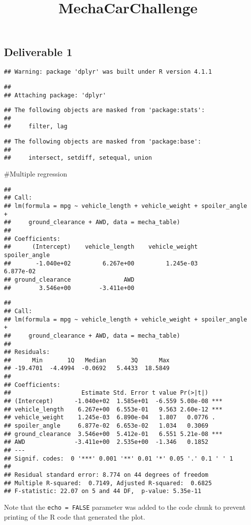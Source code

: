 \documentclass[
]{article}
\title{MechaCarChallenge}
\author{}
\date{\vspace{-2.5em}}
\begin{document}
\maketitle

\hypertarget{deliverable-1}{%
\subsection{Deliverable 1}\label{deliverable-1}}

\begin{verbatim}
## Warning: package 'dplyr' was built under R version 4.1.1
\end{verbatim}

\begin{verbatim}
## 
## Attaching package: 'dplyr'
\end{verbatim}

\begin{verbatim}
## The following objects are masked from 'package:stats':
## 
##     filter, lag
\end{verbatim}

\begin{verbatim}
## The following objects are masked from 'package:base':
## 
##     intersect, setdiff, setequal, union
\end{verbatim}

\#Multiple regression

\begin{verbatim}
## 
## Call:
## lm(formula = mpg ~ vehicle_length + vehicle_weight + spoiler_angle + 
##     ground_clearance + AWD, data = mecha_table)
## 
## Coefficients:
##      (Intercept)    vehicle_length    vehicle_weight     spoiler_angle  
##       -1.040e+02         6.267e+00         1.245e-03         6.877e-02  
## ground_clearance               AWD  
##        3.546e+00        -3.411e+00
\end{verbatim}

\begin{verbatim}
## 
## Call:
## lm(formula = mpg ~ vehicle_length + vehicle_weight + spoiler_angle + 
##     ground_clearance + AWD, data = mecha_table)
## 
## Residuals:
##      Min       1Q   Median       3Q      Max 
## -19.4701  -4.4994  -0.0692   5.4433  18.5849 
## 
## Coefficients:
##                    Estimate Std. Error t value Pr(>|t|)    
## (Intercept)      -1.040e+02  1.585e+01  -6.559 5.08e-08 ***
## vehicle_length    6.267e+00  6.553e-01   9.563 2.60e-12 ***
## vehicle_weight    1.245e-03  6.890e-04   1.807   0.0776 .  
## spoiler_angle     6.877e-02  6.653e-02   1.034   0.3069    
## ground_clearance  3.546e+00  5.412e-01   6.551 5.21e-08 ***
## AWD              -3.411e+00  2.535e+00  -1.346   0.1852    
## ---
## Signif. codes:  0 '***' 0.001 '**' 0.01 '*' 0.05 '.' 0.1 ' ' 1
## 
## Residual standard error: 8.774 on 44 degrees of freedom
## Multiple R-squared:  0.7149, Adjusted R-squared:  0.6825 
## F-statistic: 22.07 on 5 and 44 DF,  p-value: 5.35e-11
\end{verbatim}

Note that the \texttt{echo\ =\ FALSE} parameter was added to the code
chunk to prevent printing of the R code that generated the plot.
\end{document}
